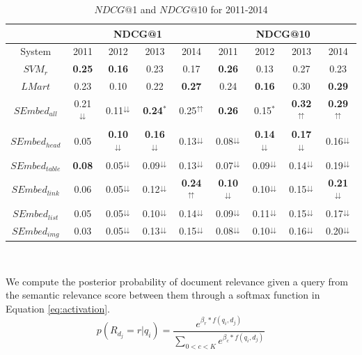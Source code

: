 \documentclass[runningheads,a4paper]{llncs}
\begin{document}
\begin{table}
 \caption {$NDCG@$1 and $NDCG@$10 for 2011-2014 }
 \label{table:network_perf} 
 \begin{tabular}{|c||c|c|c|c||c|c|c|c|} \hline
& \multicolumn{4}{|c|}{NDCG@1} &  \multicolumn{4}{|c|}{NDCG@10} \\ \hline
System &  2011 & 2012  & 2013 & 2014 &  2011 & 2012  & 2013 & 2014 \\ \hline
$SVM_r$ & \textbf{0.25} & \textbf{0.16} & 0.23 & 0.17 & \textbf{0.26} & 0.13 & 0.27 & 0.23   \\
$LMart$ & 0.23 & 0.10 & 0.22 & \textbf{0.27} & 0.24 & \textbf{0.16} & 0.30 & \textbf{0.29} \\
$SEmbed_{all}$   & 0.21$^\downdownarrows$ & 0.11$^\downdownarrows$ & \textbf{0.24$^*$}  & 0.25$^\upuparrows$ & \textbf{0.26} & 0.15$^*$ & \textbf{0.32}$^\upuparrows$ & \textbf{0.29}$^\upuparrows$\\ \hline 
$SEmbed_{head}$  & 0.05 & \textbf{0.10}$^\downdownarrows$ & \textbf{0.16}$^\downdownarrows$ & 0.13$^\downdownarrows$ & 0.08$^\downdownarrows$ & \textbf{0.14}$^\downdownarrows$ & \textbf{0.17}$^\downdownarrows$ & 0.16$^\downdownarrows$ \\ 
$SEmbed_{table}$ & \textbf{0.08}& 0.05$^\downdownarrows$& 0.09$^\downdownarrows$ & 0.13$^\downdownarrows$ & 0.07$^\downdownarrows$ & 0.09$^\downdownarrows$ & 0.14$^\downdownarrows$ & 0.19$^\downdownarrows$ \\
$SEmbed_{link}$  & 0.06& 0.05$^\downdownarrows$& 0.12$^\downdownarrows$& \textbf{0.24}$^\upuparrows$ & \textbf{0.10}$^\downdownarrows$ & 0.10$^\downdownarrows$ & 0.15$^\downdownarrows$ & \textbf{0.21}$^\downdownarrows$  \\ 
$SEmbed_{list}$  & 0.05& 0.05$^\downdownarrows$& 0.10$^\downdownarrows$ & 0.14$^\downdownarrows$ & 0.09$^\downdownarrows$ & 0.11$^\downdownarrows$ & 0.15$^\downdownarrows$ & 0.17$^\downdownarrows$\\ 
$SEmbed_{img}$   & 0.03& 0.05$^\downdownarrows$& 0.13$^\downdownarrows$& 0.15$^\downdownarrows$ & 0.08$^\downdownarrows$ & 0.10$^\downdownarrows$ & 0.16$^\downdownarrows$ & 0.20$^\downdownarrows$ \\ \hline
\end{tabular}
\\
 \end{table}
We compute the posterior probability of document relevance given a query 
from the semantic relevance score between them
through a softmax function in Equation \ref{eq:activation}. 
\begin{equation}
\label{eq:activation}
  p(R_{d_j} = r|q_i) = \frac{e^{\beta_r * f(q_i, d_j)}} {\sum_{0<c<K}e^{\beta_c * f(q_i, d_j)}}
\end{equation}
\end{document}
